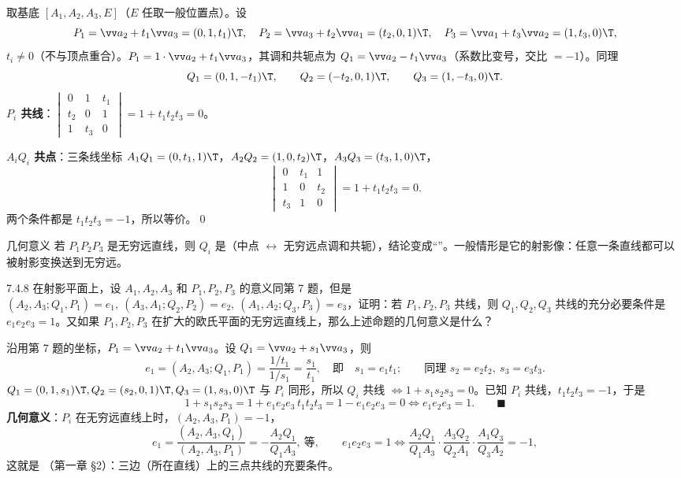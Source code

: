 \zheng 取基底 $[A_1,A_2,A_3,E]$（$E$ 任取一般位置点）。设
\[
P_1=\vv a_2+t_1\vv a_3=(0,1,t_1)\T,\quad P_2=\vv a_3+t_2\vv a_1=(t_2,0,1)\T,\quad P_3=\vv a_1+t_3\vv a_2=(1,t_3,0)\T,
\]
$t_i\neq0$（不与顶点重合）。$P_1=1\cdot\vv a_2+t_1\vv a_3$，其调和共轭点为 $Q_1=\vv a_2-t_1\vv a_3$（系数比变号，交比 $=-1$）。同理
\[
Q_1=(0,1,-t_1)\T,\qquad Q_2=(-t_2,0,1)\T,\qquad Q_3=(1,-t_3,0)\T .
\]
\textbf{$P_i$ 共线}：$\begin{vmatrix}0&1&t_1\\t_2&0&1\\1&t_3&0\end{vmatrix}=1+t_1t_2t_3=0$。

\textbf{$A_iQ_i$ 共点}：三条线坐标 $A_1Q_1=(0,t_1,1)\T$，$A_2Q_2=(1,0,t_2)\T$，$A_3Q_3=(t_3,1,0)\T$，
\[
\begin{vmatrix}0&t_1&1\\1&0&t_2\\t_3&1&0\end{vmatrix}=1+t_1t_2t_3=0 .
\]
两个条件都是 $t_1t_2t_3=-1$，所以等价。\qed

\begin{intbox}{几何意义}
若 $P_1P_2P_3$ 是无穷远直线，则 $Q_i$ 是（中点 $\leftrightarrow$ 无穷远点调和共轭），结论变成“”。一般情形是它的射影像：任意一条直线都可以被射影变换送到无穷远。
\end{intbox}

\begin{ex}{7.4.8}
在射影平面上，设 $A_1,A_2,A_3$ 和 $P_1,P_2,P_3$ 的意义同第 7 题，但是 $(A_2,A_3;Q_1,P_1)=e_1,\ (A_3,A_1;Q_2,P_2)=e_2,\ (A_1,A_2;Q_3,P_3)=e_3$，证明：若 $P_1,P_2,P_3$ 共线，则 $Q_1,Q_2,Q_3$ 共线的充分必要条件是 $e_1e_2e_3=1$。又如果 $P_1,P_2,P_3$ 在扩大的欧氏平面的无穷远直线上，那么上述命题的几何意义是什么？
\end{ex}
\zheng 沿用第 7 题的坐标，$P_1=\vv a_2+t_1\vv a_3$。设 $Q_1=\vv a_2+s_1\vv a_3$，则
\[
e_1=(A_2,A_3;Q_1,P_1)=\frac{1/t_1}{1/s_1}=\frac{s_1}{t_1},\quad\text{即}\quad s_1=e_1t_1;\qquad\text{同理 } s_2=e_2t_2,\ s_3=e_3t_3 .
\]
$Q_1=(0,1,s_1)\T,Q_2=(s_2,0,1)\T,Q_3=(1,s_3,0)\T$ 与 $P_i$ 同形，所以 $Q_i$ 共线 $\iff 1+s_1s_2s_3=0$。已知 $P_i$ 共线，$t_1t_2t_3=-1$，于是
\[
1+s_1s_2s_3=1+e_1e_2e_3\,t_1t_2t_3=1-e_1e_2e_3=0\iff e_1e_2e_3=1.\qquad\blacksquare
\]
\textbf{几何意义}：$P_i$ 在无穷远直线上时，$(A_2,A_3,P_1)=-1$，
\[
e_1=\frac{(A_2,A_3,Q_1)}{(A_2,A_3,P_1)}=-\frac{A_2Q_1}{Q_1A_3},\ \text{等},
\qquad e_1e_2e_3=1\iff \frac{A_2Q_1}{Q_1A_3}\cdot\frac{A_3Q_2}{Q_2A_1}\cdot\frac{A_1Q_3}{Q_3A_2}=-1,
\]
这就是 （第一章 \S2）：三边（所在直线）上的三点共线的充要条件。

